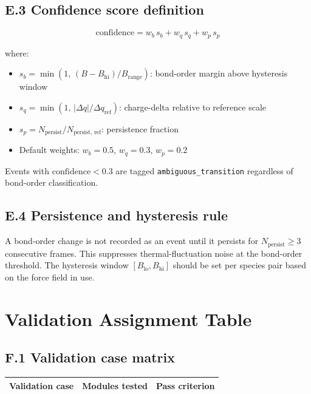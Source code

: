 \documentclass[11pt, a4paper, oneside]{article}
\begin{document}
\begin{appendices}
\subsection*{E.3 Confidence score definition}

\begin{equation}
  \mathrm{confidence} = w_b\,s_b + w_q\,s_q + w_p\,s_p
  \tag{E.1}
\end{equation}

where:
\begin{itemize}
  \item $s_b = \min(1,\, (B - B_{\mathrm{hi}}) / B_{\mathrm{range}})$:
	bond-order margin above hysteresis window
  \item $s_q = \min(1,\, |\Delta q| / \Delta q_{\mathrm{ref}})$:
	charge-delta relative to reference scale
  \item $s_p = N_{\mathrm{persist}} / N_{\mathrm{persist,\,ref}}$:
	persistence fraction
  \item Default weights: $w_b = 0.5$, $w_q = 0.3$, $w_p = 0.2$
\end{itemize}

Events with $\mathrm{confidence} < 0.3$ are tagged
\texttt{ambiguous\_transition} regardless of bond-order classification.

\subsection*{E.4 Persistence and hysteresis rule}

A bond-order change is not recorded as an event until it persists for
$N_{\mathrm{persist}} \geq 3$ consecutive frames. This suppresses
thermal-fluctuation noise at the bond-order threshold. The hysteresis
window $[B_{\mathrm{lo}}, B_{\mathrm{hi}}]$ should be set per
species pair based on the force field in use.

\section{Validation Assignment Table}
\label{app:F}

\subsection*{F.1 Validation case matrix}

\begin{longtable}{p{4.5cm} p{4.5cm} p{5.5cm}}
  \toprule
  \textbf{Validation case} & \textbf{Modules tested} & \textbf{Pass criterion} \\
  \midrule
  \endhead


\end{longtable}
\end{appendices}
\end{document}
